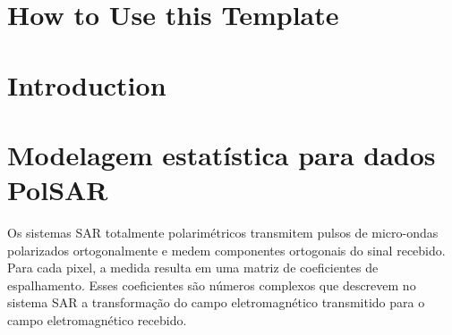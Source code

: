 \documentclass[remotesensing,article,submit,moreauthors,pdftex]{Definitions/mdpi}
\begin{document}

\setcounter{section}{-1} %
\section{How to Use this Template}


\section{Introduction}
\section{Modelagem estatística para dados PolSAR}\label{cap_acf_sec1}
Os sistemas SAR totalmente polarimétricos transmitem pulsos de micro-ondas polarizados ortogonalmente e medem componentes ortogonais do sinal recebido. Para cada pixel, a medida resulta em uma matriz de coeficientes de espalhamento. Esses coeficientes são números complexos que descrevem no sistema SAR a transformação do campo eletromagnético transmitido para o campo eletromagnético recebido.
\end{document}

